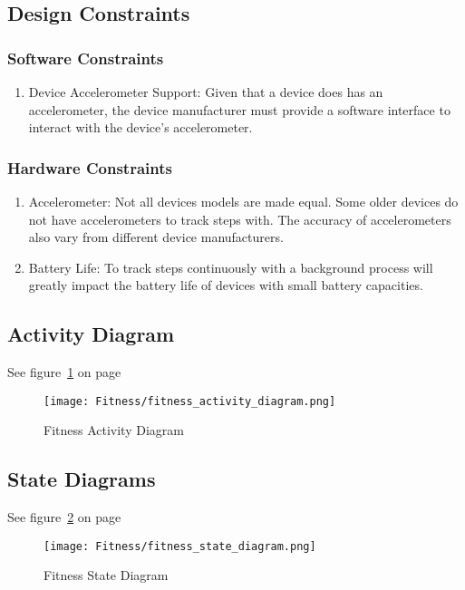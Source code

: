 \subsection{Design Constraints}

\subsubsection{Software Constraints}
\begin{enumerate}
	\item Device Accelerometer Support:
	\newline
	Given that a device does has an accelerometer, the device manufacturer must provide a software interface to interact with the device's accelerometer.
\end{enumerate}

\subsubsection{Hardware Constraints}
\begin{enumerate}
	\item Accelerometer:
	\newline
	Not all devices models are made equal. Some older devices do not have accelerometers to track steps with. The accuracy of accelerometers also vary from different device manufacturers.
	\item Battery Life:
	\newline
	To track steps continuously with a background process will greatly impact the battery life of devices with small battery capacities. 
\end{enumerate}

\subsection{Activity Diagram}
See figure~\ref{fig:fitness_activity_diagram} on page~\pageref{fig:fitness_activity_diagram}
\begin{figure}
	\centering
	\texttt{[image: Fitness/fitness\_activity\_diagram.png]}
	\caption{Fitness Activity Diagram}
	\label{fig:fitness_activity_diagram}
\end{figure}

\subsection{State Diagrams}
See figure~\ref{fig:fitness_state_diagram} on page~\pageref{fig:fitness_state_diagram}
\begin{figure}
	\centering
	\texttt{[image: Fitness/fitness\_state\_diagram.png]}
	\caption{Fitness State Diagram}
	\label{fig:fitness_state_diagram}
\end{figure}